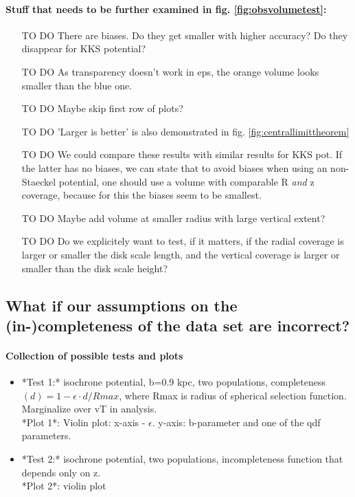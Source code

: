 \documentclass[12pt,preprint]{aastex}
\begin{document}
\paragraph{Stuff that needs to be further examined in fig. \ref{fig:obsvolumetest}:}
\begin{itemize}
\item [TO DO] There are biases. Do they get smaller with higher accuracy? Do they disappear for KKS potential?
\item [TO DO]  As transparency doesn't work in eps, the orange volume looks smaller than the blue one.
\item [TO DO] Maybe skip first row of plots?
\item [TO DO] 'Larger is better' is also demonstrated in fig. \ref{fig:centrallimittheorem}
\item [TO DO] We could compare these results with similar results for KKS pot. If the latter has no biases, we can state that to avoid biases when using an non-Staeckel potential, one should use a volume with comparable R \textit{and} z coverage, because for this the biases seem to be smallest.
\item [TO DO] Maybe add volume at smaller radius with large vertical extent?
\item [TO DO] Do we explicitely want to test, if it matters, if the radial coverage is larger or smaller the disk scale length, and the vertical coverage is larger or smaller than the disk scale height?
\end{itemize}

     
\subsection{What if our assumptions on the (in-)completeness of the data set are incorrect?}

\paragraph{Collection of possible tests and plots}

\begin{itemize}
\item  *Test 1:* isochrone potential, b=0.9 kpc, two populations, completeness$(d) = 1 - \epsilon \cdot d/Rmax$, where Rmax is radius of spherical selection function. Marginalize over vT in analysis. \\
*Plot 1*: Violin plot: x-axis - $\epsilon$. y-axis: b-parameter and one of the qdf parameters.
\item  *Test 2:* isochrone potential, two populations, incompleteness function that depends only on z. \\
*Plot 2*: violin plot
\end{itemize}
\end{document}
